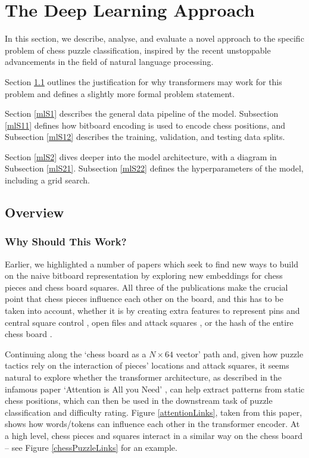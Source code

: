 \chapter{The Deep Learning Approach}\label{mlChapter}

In this section, we describe, analyse, and evaluate a novel approach to the
specific problem of chess puzzle classification, inspired by the recent
unstoppable advancements in the field of natural language processing.

Section \ref{mlS0} outlines the justification for why transformers may work for
this problem and defines a slightly more formal problem statement.

Section \ref{mlS1} describes the general data pipeline of the model. Subsection
\ref{mlS11} defines how bitboard encoding is used to encode chess positions,
and Subsection \ref{mlS12} describes the training, validation, and testing data
splits.

Section \ref{mlS2} dives deeper into the model architecture, with a diagram in
Subsection \ref{mlS21}. Subsection \ref{mlS22} defines the hyperparameters of
the model, including a grid search.

\section{Overview}\label{mlS0}

\subsection{Why Should This Work?}

Earlier, we highlighted a number of papers which seek to find new ways to build
on the naive bitboard representation \citep{middleGamePatterns, chessCNN,
chess2vec} by exploring new embeddings for chess pieces and chess board
squares. All three of the publications make the crucial point that chess pieces
influence each other on the board, and this has to be taken into account,
whether it is by creating extra features to represent pins and central square
control \citep{chessCNN}, open files and attack squares
\citep{middleGamePatterns}, or the hash of the entire chess board
\cite{chess2vec}.

Continuing along the `chess board as a $N\times64$ vector' path and, given how
puzzle tactics rely on the interaction of pieces' locations and attack squares,
it seems natural to explore whether the transformer architecture, as described
in the infamous paper `Attention is All you Need' \citep{attention}, can help
extract patterns from static chess positions, which can then be used in the
downstream task of puzzle classification and difficulty rating. Figure
\ref{attentionLinks}, taken from this paper, shows how words/tokens can
influence each other in the transformer encoder. At a high level, chess pieces
and squares interact in a similar way on the chess board -- see Figure
\ref{chessPuzzleLinks} for an example.

